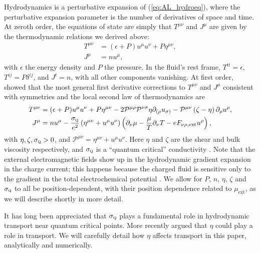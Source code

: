 Hydrodynamics is a perturbative expansion of (\ref{eq:AL_hydroeq}), where the perturbative expansion parameter is the number of derivatives of space and time.   At zeroth order, the equations of state are simply that $T^{\mu\nu}$ and $J^\mu$ are given by the  thermodynamic  relations we derived above:  \begin{subequations}\begin{align}
T^{\mu\nu} &=  (\epsilon + P)u^\mu u^\nu + P \eta^{\mu\nu}, \\
J^\mu &=  n u^\mu,
\end{align}\end{subequations} with $\epsilon$ the energy density and $P$ the pressure.   In the fluid's rest frame,  $T^{tt}=\epsilon$, $T^{ij} = P\delta^{ij}$, and $J^t=n$, with all other components vanishing.  At first order, \cite{hartnoll_theory_2007} showed that the most general first derivative corrections to $T^{\mu\nu}$ and $J^\mu$ consistent with symmetries and the local second law of thermodynamics are \begin{subequations}\begin{align}
T^{\mu\nu} &= (\epsilon +P )u^\mu u^\nu + P\eta^{\mu\nu}-2\mathcal{P}^{\mu\rho}\mathcal{P}^{\nu\sigma}\eta \partial_{(\rho} u_{\sigma)} - \mathcal{P}^{\mu\nu}\left(\zeta-\eta\right)\partial_\rho u^\rho   , \\
J^\mu &=  n u^\mu - \frac{\sigma_{\textsc{q}}}{e^2} \left(\eta^{\mu\nu}+u^\mu u^\nu\right)\left(\partial_\nu \mu - \frac{\mu}{T}\partial_\nu T - eF_{\nu\rho,\text{ext}}u^\rho\right),
\end{align}\end{subequations}
with $\eta,\zeta,\sigma_{\textsc{q}} >0$, and $\mathcal{P}^{\mu\nu} = \eta^{\mu\nu} + u^\mu u^\nu$.    Here $\eta$ and $\zeta$ are the shear and bulk viscosity respectively, and $\sigma_{\textsc{q}}$ is a ``quantum critical'' conductivity \cite{hartnoll_theory_2007}.
  Note that the external electromagnetic fields show up in the hydrodynamic gradient expansion in the charge current;  this happens because the charged fluid is sensitive only to the gradient in the total electrochemical potential \cite{pines_theory_1994}.  We allow for $P$, $n$, $\eta$, $\zeta$ and $\sigma_{\textsc{q}}$ to all be position-dependent, with their position dependence related to $\mu_{\mathrm{ext}}$, as we will describe shortly in more detail.   

It has long been appreciated \cite{hartnoll_theory_2007} that $\sigma_{\textsc{q}}$ plays a fundamental role in hydrodynamic transport near quantum critical points.   More recently \cite{davison_holographic_2014} argued that $\eta$ could play a role in transport.   We will carefully detail how $\eta$ affects transport in this paper, analytically and numerically.


